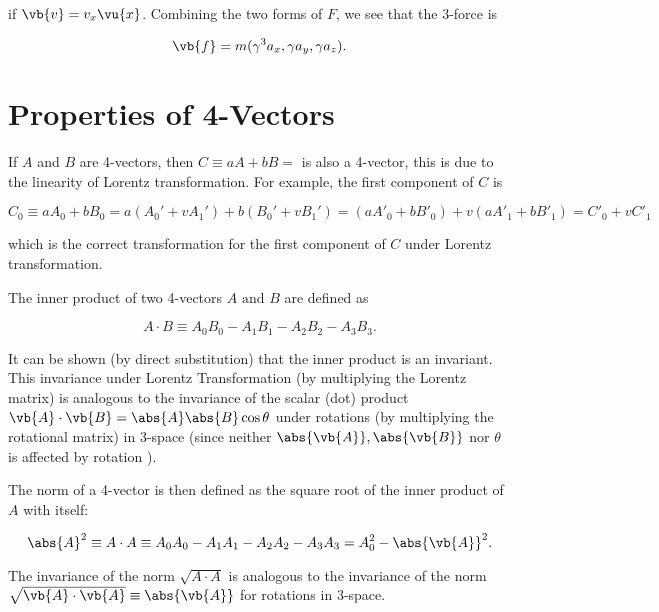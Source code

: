 \documentclass[english,a4paper,12pt]{report}
\begin{document}
if \(\vb{v} = v_{x}\vu{x}  \). Combining the two forms of \(F\), we see that the 3-force is

\begin{equation}
    \vb{f} = m(\gamma ^3 a_{x}, \gamma a_{y}, \gamma a_{z}).
\end{equation}

\section{Properties of 4-Vectors}

If \(A\) and \(B\) are 4-vectors, then \(C \equiv aA + bB = \) is also a 4-vector, this is due to the linearity of Lorentz transformation. For example, the first component of \(C\) is

\begin{equation}
    C_0 \equiv aA_0 + bB_0  = a(A_0 ' + v A_1 ') + b(B_0 ' + vB_1 ') = (aA'_{0} + b B'_{0}) + v(aA'_{1} + bB'_{1}  ) = C'_{0} + vC'_{1}  
\end{equation}

which is the correct transformation for the first component of \(C\) under Lorentz transformation.

The inner product of two 4-vectors \(A \text { and } B\) are defined as 

\begin{equation}
    A \cdot B \equiv A_0 B_0 - A_1 B_1  - A_2 B_2 - A_3 B_3.
\end{equation}

It can be shown (by direct substitution) that the inner product is an invariant. This invariance under Lorentz Transformation (by multiplying the Lorentz matrix) is analogous to the invariance of the scalar (dot) product \(\vb{A} \cdot \vb{B} = \abs{A}\abs{B}\cos \theta   \) under rotations (by multiplying the rotational matrix) in 3-space (since neither \(\abs{\vb{A} }, \abs{\vb{B} }   \) nor \(\theta \) is affected by rotation ). 

The norm of a 4-vector is then defined as the square root of the inner product of \(A\) with itself:

\begin{equation}
    \abs{A}^2 \equiv A \cdot A \equiv A_0 A_0 - A_1 A_1 -A_2 A_2 -A_3 A_3  = A_0 ^2 - \abs{\vb{A} }^2.  
\end{equation}

The invariance of the norm \(\sqrt{A \cdot A} \) is analogous to the invariance of the norm \(\sqrt{\vb{A} \cdot \vb{A} } \equiv \abs{\vb{A} } \) for rotations in 3-space. 
\end{document}
